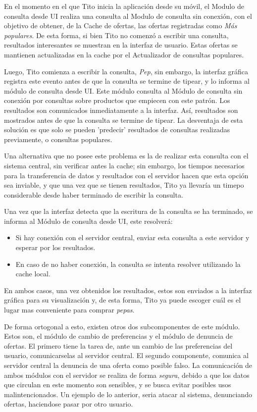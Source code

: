 En el momento en el que Tito inicia la aplicación desde su móvil, el \textsf{Modulo de consulta desde UI} realiza una consulta al \textsf{Modulo de consulta sin conexión}, con el objetivo de obtener, de la \textsf{Cache de ofertas}, las ofertas registradas como \emph{Más populares}. De esta forma, si bien Tito no comenzó a escribir una consulta, resultados interesantes se muestran en la interfaz de usuario. Estas ofertas se mantienen actualizadas en la cache por el \textsf{Actualizador de consultas populares}.

Luego, Tito comienza a escribir la consulta, \emph{Pep}, sin embargo, la interfaz gráfica registra este evento antes de que la consulta se termine de tipear, y lo informa al \textsf{módulo de consulta desde UI}. Este módulo consulta al \textsf{Módulo de consulta sin conexión} por consultas sobre productos que empiecen con este patrón. Los resultados son comunicados inmediatamente a la interfaz. Así, resultados son mostrados antes de que la consulta se termine de tipear. La desventaja de esta solución es que solo se pueden 'predecir' resultados de consultas realizadas previamente, o consultas populares.

Una alternativa que no posee este problema es la de realizar esta consulta con el sistema central, sin verificar antes la cache; sin embargo, los tiempos necesarios para la transferencia de datos y resultados con el servidor hacen que esta opción sea inviable, y que una vez que se tienen resultados, Tito ya llevaría un timepo considerable desde haber terminado de escribir la consulta.

Una vez que la interfaz detecta que la escritura de la consulta se ha terminado, se informa al \textsf{Módulo de consulta desde UI}, este resolverá:
\begin{itemize}
	\item Si hay conexión con el servidor central, enviar esta consulta a este servidor y esperar por los resultados. 
	\item En caso de no haber conexión, la consulta se intenta resolver utilizando la cache local.
\end{itemize}

En ambos casos, una vez obtenidos los resultados, estos son enviados a la interfaz gráfica para su visualización y, de esta forma, Tito ya puede escoger cuál es el lugar mas conveniente para comprar \emph{pepas}.

De forma ortogonal a esto, existen otros dos subcomponentes de este módulo. Estos son, el \textsf{módulo de cambio de preferencias} y el \textsf{módulo de denuncia de ofertas}. El primero tiene la tarea de, ante un cambio de las preferencias del usuario, comunicarselas al servidor central. El segundo componente, comunica al servidor central la denuncia de una oferta como posible falso. La comunicación de ambos módulos con el servidor se realiza de forma \emph{segura}, debido a que los datos que circulan en este momento son sensibles, y se busca evitar posibles usos malintencionados. Un ejemplo de lo anterior, seria atacar al sistema, denunciando ofertas, haciendose pasar por otro usuario.

